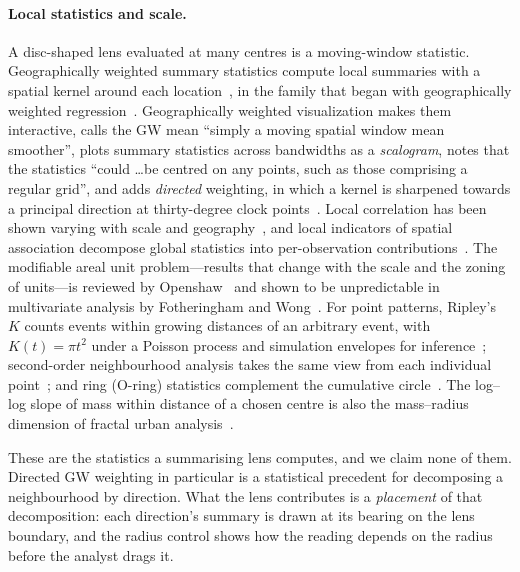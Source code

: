 \paragraph{Local statistics and scale.} A disc-shaped lens evaluated at many
centres is a moving-window statistic. Geographically weighted summary
statistics compute local summaries with a spatial kernel around each
location~\cite{brunsdon2002gwss}, in the family that began with geographically
weighted regression~\cite{brunsdon1996gwr}. Geographically weighted
visualization makes them interactive, calls the GW mean ``simply a moving
spatial window mean smoother'', plots summary statistics across bandwidths as a
\emph{scalogram}, notes that the statistics ``could \ldots be centred on any
points, such as those comprising a regular grid'', and adds \emph{directed}
weighting, in which a kernel is sharpened towards a principal direction at
thirty-degree clock points~\cite{dykes2007gwvis}. Local correlation has been shown
varying with scale and geography~\cite{goodwin2016multiple}, and local indicators of
spatial association decompose global statistics into per-observation
contributions~\cite{anselin1995lisa}. The modifiable areal unit problem---results
that change with the scale and the zoning of units---is reviewed by
Openshaw~\cite{openshaw1984maup} and shown to be unpredictable in multivariate
analysis by Fotheringham and Wong~\cite{fotheringham1991maup}. For point patterns,
Ripley's $K$ counts events within growing distances of an arbitrary event, with
$K(t)=\pi t^2$ under a Poisson process and simulation envelopes for
inference~\cite{ripley1977modelling}; second-order neighbourhood analysis takes the
same view from each individual point~\cite{getis1987second}; and ring (O-ring)
statistics complement the cumulative circle~\cite{wiegand2004rings}. The
log--log slope of mass within distance of a chosen centre is also the mass--radius
dimension of fractal urban analysis~\cite{yamu2016fractal}.

These are the statistics a summarising lens computes, and we claim none of
them. Directed GW weighting in particular is a statistical precedent for
decomposing a neighbourhood by direction. What the lens contributes is a
\emph{placement} of that decomposition: each direction's summary is drawn at its
bearing on the lens boundary, and the radius control shows how the reading
depends on the radius before the analyst drags it.
